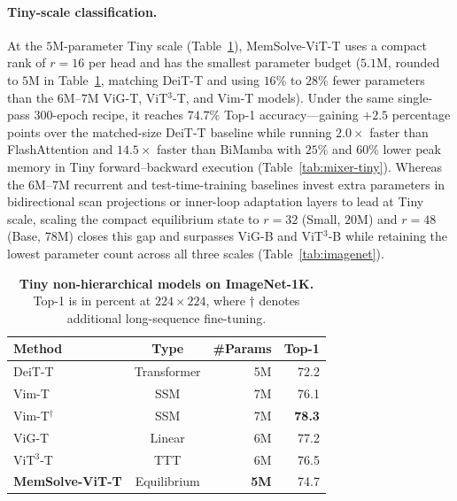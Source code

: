 \documentclass[10pt,twocolumn]{article}
\let\draftsmall\small
\renewcommand{\small}{\draftsmall\fontsize{9}{10}\selectfont}
\begin{document}
\paragraph{Tiny-scale classification.}
At the $5$M-parameter Tiny scale (Table~\ref{tab:imagenet-tiny}),
MemSolve-ViT-T uses a compact rank of $r=16$ per head and has the smallest
parameter budget ($5.1$M, rounded to $5$M in Table~\ref{tab:imagenet-tiny},
matching DeiT-T and using $16\%$ to $28\%$ fewer parameters than the
$6$M--$7$M ViG-T, ViT$^3$-T, and Vim-T models).
Under the same single-pass 300-epoch recipe, it reaches $74.7\%$ Top-1
accuracy---gaining $+2.5$ percentage points over the matched-size DeiT-T
baseline while running $2.0\times$ faster than FlashAttention and $14.5\times$
faster than BiMamba with $25\%$ and $60\%$ lower peak memory in Tiny
forward--backward execution (Table~\ref{tab:mixer-tiny}).
Whereas the $6$M--$7$M recurrent and test-time-training baselines invest extra
parameters in bidirectional scan projections or inner-loop adaptation layers to
lead at Tiny scale, scaling the compact equilibrium state to $r=32$ (Small,
$20$M) and $r=48$ (Base, $78$M) closes this gap and surpasses ViG-B and
ViT$^3$-B while retaining the lowest parameter count across all three scales
(Table~\ref{tab:imagenet}).

\begin{table}[!ht]
\centering
\small
\captionsetup{width=.68\linewidth}
\renewcommand{\arraystretch}{1.04}
\setlength{\tabcolsep}{9pt}
\begin{tabular}{lcrr}
\toprule
Method & Type & \#Params & Top-1\\
\midrule
DeiT-T \cite{touvron2021deit} & Transformer & 5M & 72.2\\
Vim-T \cite{zhu2024vim} & SSM & 7M & 76.1\\
Vim-T$^\dagger$ \cite{zhu2024vim} & SSM & 7M & \textbf{78.3}\\
ViG-T \cite{liao2025vig} & Linear & 6M & 77.2\\
ViT$^3$-T \cite{han2026vit3} & TTT & 6M & 76.5\\
\rowcolor{ResultYellow}
\textbf{MemSolve-ViT-T} & Equilibrium & \textbf{5M} & 74.7\\
\bottomrule
\end{tabular}
\caption{\textbf{Tiny non-hierarchical models on ImageNet-1K.}
Top-1 is in percent at $224\times224$, where $\dagger$ denotes additional
long-sequence fine-tuning.}
\label{tab:imagenet-tiny}
\end{table}
\end{document}
